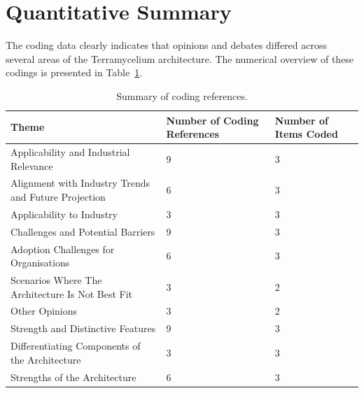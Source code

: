 \documentclass{ieeeaccess}
\begin{document}
\section{Quantitative Summary} \label{expertOpinion_quantitativeSummary}

The coding data clearly indicates that opinions and debates differed across several areas of the Terramycelium architecture. The numerical overview of these codings is presented in Table~\ref{tab:coding_summary}.

\begin{table}

  \centering

  \caption{Summary of coding references.}

  \begin{tabular}{p{}p{}p{}}

  \hline

  Theme & Number of Coding References & Number of Items Coded \\

  \hline

  Applicability and Industrial Relevance & 9 & 3 \\

  Alignment with Industry Trends and Future Projection & 6 & 3 \\

  Applicability to Industry & 3 & 3 \\

  Challenges and Potential Barriers & 9 & 3 \\

  Adoption Challenges for Organisations & 6 & 3 \\

  Scenarios Where The Architecture Is Not Best Fit & 3 & 2 \\

  Other Opinions & 3 & 2 \\

  Strength and Distinctive Features & 9 & 3 \\

  Differentiating Components of the Architecture & 3 & 3 \\

  Strengths of the Architecture & 6 & 3 \\

  \hline

  \end{tabular}

  \label{tab:coding_summary}

  \end{table}
\end{document}
